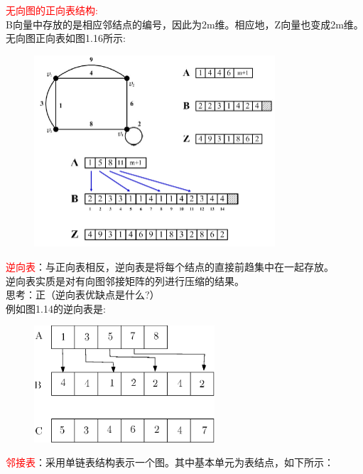 \documentclass[11pt,a4paper,openany]{book}
\newcommand{\hwxw}{\CJKfamily{hwxw}}
\begin{document}
\textcolor{red}{无向图的正向表结构:}\\
B向量中存放的是相应邻结点的编号，因此为2m维。相应地，Z向量也变成2m维。\\
无向图正向表如图1.16所示:\\
\begin{figure}[H]
  \centering
  \includegraphics[width=0.8\textwidth]{1.16.png}\\
  \caption{}
\end{figure}
\textcolor{red}{逆向表}：与正向表相反，逆向表是将每个结点的直接前趋集中在一起存放。\\
逆向表实质是对有向图邻接矩阵的列进行压缩的结果。\\
{\hwxw 思考：正（逆向表优缺点是什么?）}\\
例如图1.14的逆向表是:\\
\begin{figure}[H]
  \centering
  \includegraphics[width=0.6\textwidth]{1_17.eps}\\
  \caption*{}
\end{figure}
\textcolor{red}{邻接表}：采用单链表结构表示一个图。其中基本单元为表结点，如下所示：\\
\end{document}
